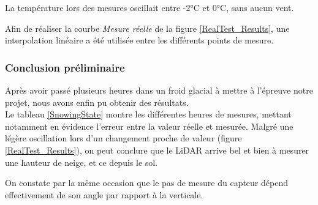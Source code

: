 La température lors des mesures oscillait entre -2°C et 0°C, sans aucun vent.\par 
Afin de réaliser la courbe \emph{Mesure réelle} de la figure \ref{RealTest_Results}, une interpolation
linéaire a été utilisée entre les différents points de mesure.

\subsubsection{Conclusion préliminaire} 

Après avoir passé plusieurs heures dans un froid glacial à mettre à l'épreuve notre projet, nous avons 
enfin pu obtenir des résultats.\\
Le tableau \ref{SnowingState} montre les différentes heures de mesures, mettant notamment en évidence
l'erreur entre la valeur réelle et mesurée. Malgré une légère oscillation lors d'un changement proche
de valeur (figure \ref{RealTest_Results}), on peut conclure que le LiDAR arrive bel et bien à mesurer 
une hauteur de neige, et ce depuis le sol.\par 
On constate par la même occasion que le pas de mesure du capteur dépend effectivement de son angle par 
rapport à la verticale.